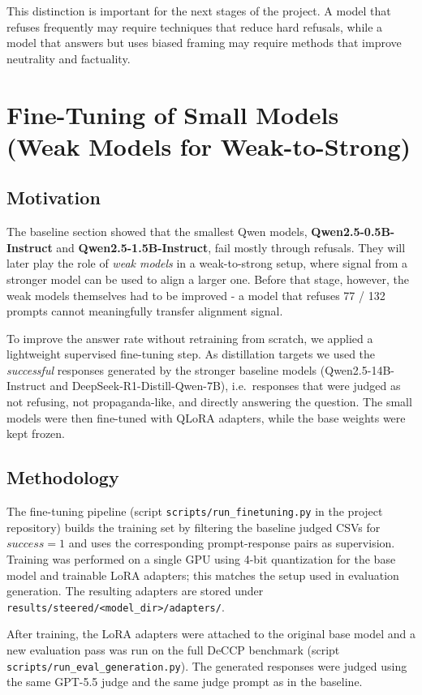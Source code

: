 \documentclass[11pt,a4paper]{article}
\begin{document}
This distinction is important for the next stages of the project. A model that refuses frequently may require techniques that reduce hard refusals, while a model that answers but uses biased framing may require methods that improve neutrality and factuality.

\section{Fine-Tuning of Small Models (Weak Models for Weak-to-Strong)}

\subsection{Motivation}
The baseline section showed that the smallest Qwen models, \textbf{Qwen2.5-0.5B-Instruct} and \textbf{Qwen2.5-1.5B-Instruct}, fail mostly through refusals. They will later play the role of \emph{weak models} in a weak-to-strong setup, where signal from a stronger model can be used to align a larger one. Before that stage, however, the weak models themselves had to be improved - a model that refuses 77 / 132 prompts cannot meaningfully transfer alignment signal.

To improve the answer rate without retraining from scratch, we applied a lightweight supervised fine-tuning step. As distillation targets we used the \emph{successful} responses generated by the stronger baseline models (Qwen2.5-14B-Instruct and DeepSeek-R1-Distill-Qwen-7B), i.e.\ responses that were judged as not refusing, not propaganda-like, and directly answering the question. The small models were then fine-tuned with QLoRA adapters, while the base weights were kept frozen.

\subsection{Methodology}
The fine-tuning pipeline (script \texttt{scripts/run\_finetuning.py} in the project repository) builds the training set by filtering the baseline judged CSVs for $success = 1$ and uses the corresponding prompt-response pairs as supervision. Training was performed on a single GPU using 4-bit quantization for the base model and trainable LoRA adapters; this matches the setup used in evaluation generation. The resulting adapters are stored under \texttt{results/steered/<model\_dir>/adapters/}.

After training, the LoRA adapters were attached to the original base model and a new evaluation pass was run on the full DeCCP benchmark (script \texttt{scripts/run\_eval\_generation.py}). The generated responses were judged using the same GPT-5.5 judge and the same judge prompt as in the baseline.
\end{document}
